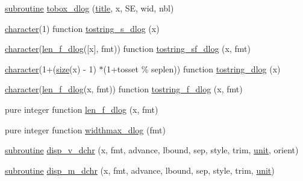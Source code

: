 \begin{DoxyCompactItemize}
\item 
\hyperlink{M__stopwatch_83_8txt_acfbcff50169d691ff02d4a123ed70482}{subroutine} \hyperlink{namespacem__display_abaf23628781d863ca3d9bba0b3b01707}{tobox\+\_\+dlog} (\hyperlink{print__watch_83_8txt_a15b5bd21156bb9fca6a755ab8c029a9c}{title}, x, SE, wid, nbl)
\item 
\hyperlink{option__stopwatch_83_8txt_abd4b21fbbd175834027b5224bfe97e66}{character}(1) function \hyperlink{namespacem__display_a75e826c601efdb91148684ebaf34788b}{tostring\+\_\+s\+\_\+dlog} (x)
\item 
\hyperlink{option__stopwatch_83_8txt_abd4b21fbbd175834027b5224bfe97e66}{character}(\hyperlink{namespacem__display_a2a298a8f2faf00047152b93cd265d396}{len\+\_\+f\+\_\+dlog}(\mbox{[}x\mbox{]}, fmt)) function \hyperlink{namespacem__display_a833175a75a1f2563fb749394bc577196}{tostring\+\_\+sf\+\_\+dlog} (x, fmt)
\item 
\hyperlink{option__stopwatch_83_8txt_abd4b21fbbd175834027b5224bfe97e66}{character}(1+(\hyperlink{what__overview_81_8txt_ab5692ed87074f1d5ec850a9ffa8b5af9}{size}(x) -\/ 1) $\ast$(1+tosset \% seplen)) function \hyperlink{namespacem__display_ac4b7da9242ea26fd744e1301444d374a}{tostring\+\_\+dlog} (x)
\item 
\hyperlink{option__stopwatch_83_8txt_abd4b21fbbd175834027b5224bfe97e66}{character}(\hyperlink{namespacem__display_a2a298a8f2faf00047152b93cd265d396}{len\+\_\+f\+\_\+dlog}(x, fmt)) function \hyperlink{namespacem__display_aa23f6d3ab75d3383a0e95a4582cedc87}{tostring\+\_\+f\+\_\+dlog} (x, fmt)
\item 
pure integer function \hyperlink{namespacem__display_a2a298a8f2faf00047152b93cd265d396}{len\+\_\+f\+\_\+dlog} (x, fmt)
\item 
pure integer function \hyperlink{namespacem__display_ac342ada170e8066fa938cf8eb69f09bb}{widthmax\+\_\+dlog} (fmt)
\item 
\hyperlink{M__stopwatch_83_8txt_acfbcff50169d691ff02d4a123ed70482}{subroutine} \hyperlink{namespacem__display_a9be0f6a0bd57a08e389fe742311b7a02}{disp\+\_\+v\+\_\+dchr} (x, fmt, advance, lbound, sep, style, trim, \hyperlink{M__stopwatch_83_8txt_a5cbef30eb7c0d734bd82f5a7ebea9aa7}{unit}, orient)
\item 
\hyperlink{M__stopwatch_83_8txt_acfbcff50169d691ff02d4a123ed70482}{subroutine} \hyperlink{namespacem__display_aa72655968e5accf7c77477693c9f1bfa}{disp\+\_\+m\+\_\+dchr} (x, fmt, advance, lbound, sep, style, trim, \hyperlink{M__stopwatch_83_8txt_a5cbef30eb7c0d734bd82f5a7ebea9aa7}{unit})
\item 

\end{DoxyCompactItemize}
